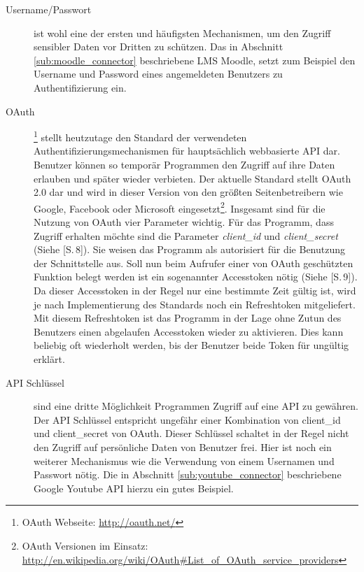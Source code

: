 \begin{description}
    \item[Username/Passwort] ist wohl eine der ersten und häufigsten Mechanismen, um den Zugriff sensibler Daten vor Dritten zu schützen. Das in Abschnitt \ref{sub:moodle_connector} beschriebene LMS Moodle, setzt zum Beispiel den Username und Password eines angemeldeten Benutzers zu Authentifizierung ein.
    
    \item[OAuth]\footnote{OAuth Webseite: \url{http://oauth.net/}} stellt heutzutage den Standard der verwendeten Authentifizierungsmechanismen für hauptsächlich webbasierte API dar. Benutzer können so temporär Programmen den Zugriff auf ihre Daten erlauben und später wieder verbieten. Der aktuelle Standard stellt OAuth 2.0 dar und wird in dieser Version von den größten Seitenbetreibern wie Google, Facebook oder Microsoft eingesetzt\footnote{OAuth Versionen im Einsatz: \url{http://en.wikipedia.org/wiki/OAuth\#List\_of\_OAuth\_service\_providers}}. Insgesamt sind für die Nutzung von OAuth vier Parameter wichtig. Für das Programm, dass Zugriff erhalten möchte sind die Parameter \emph{client\_id} und \emph{client\_secret} (Siehe \cite{rfc6749}[S.\,8]). Sie weisen das Programm als autorisiert für die Benutzung der Schnittstelle aus. Soll nun beim Aufrufer einer von OAuth geschützten Funktion belegt werden ist ein sogenannter Accesstoken nötig (Siehe \cite{rfc6749}[S.\,9]). Da dieser Accesstoken in der Regel nur eine bestimmte Zeit gültig ist, wird je nach Implementierung des Standards noch ein Refreshtoken mitgeliefert. Mit diesem Refreshtoken ist das Programm in der Lage ohne Zutun des Benutzers einen abgelaufen Accesstoken wieder zu aktivieren. Dies kann beliebig oft wiederholt werden, bis der Benutzer beide Token für ungültig erklärt.
    
    \item[API Schlüssel] sind eine dritte Möglichkeit Programmen Zugriff auf eine API zu gewähren. Der API Schlüssel entspricht ungefähr einer Kombination von client\_id und client\_secret von OAuth. Dieser Schlüssel schaltet in der Regel nicht den Zugriff auf persönliche Daten von Benutzer frei. Hier ist noch ein weiterer Mechanismus wie die Verwendung von einem Usernamen und Passwort nötig. Die in Abschnitt \ref{sub:youtube_connector}  beschriebene Google Youtube API hierzu ein gutes Beispiel.
\end{description}

